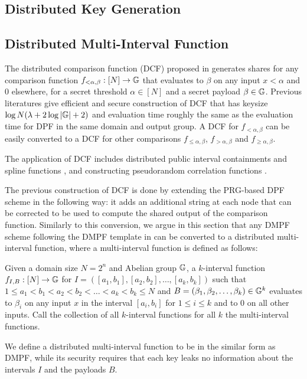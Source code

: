 \subsection{Distributed Key Generation}

\subsection{Distributed Multi-Interval Function}
The distributed comparison function (DCF) proposed in  generates shares for any comparison function $f_{<\alpha, \beta}:[N]\rightarrow \mathbb{G}$ that evaluates to $\beta$ on any input $x<\alpha$ and 0 elsewhere, for a secret threshold $\alpha\in[N]$ and a secret payload $\beta\in \mathbb{G}$. Previous literatures give efficient and secure construction of DCF that has keysize $\log N(\lambda+2\log |\mathbb{G}|+2)$ and evaluation time roughly the same as the evaluation time for DPF in the same domain and output group. A DCF for $f_{<\alpha, \beta}$ can be easily converted to a DCF for other comparisons $f_{\le \alpha, \beta}$, $f_{>\alpha,\beta}$ and $f_{\ge \alpha,\beta}$. 

The application of DCF includes distributed public interval containments and spline functions \cite{cryptoeprint:2020/1392,cryptoeprint:2019/1095}, and constructing pseudorandom correlation functions \cite{cryptoeprint:2022/1014}. 


The previous construction of DCF is done by extending the PRG-based DPF scheme in the following way: it adds an additional string at each node that can be corrected to be used to compute the shared output of the comparison function. Similarly to this conversion, we argue in this section that any DMPF scheme following the DMPF template in  can be converted to a distributed multi-interval function, where a multi-interval function is defined as follows: 
\begin{definition}
  Given a domain size $N=2^n$ and Abelian group $\mathbb{G}$, a $k$-interval function $f_{I,B}:[N]\rightarrow \mathbb{G}$ for $I = \left([a_1,b_1], [a_2,b_2], \dots, [a_k,b_k]\right)$ such that $1\le a_1<b_1<a_2<b_2<\dots<a_k<b_k\le N$ and $B = (\beta_1,\beta_2,\dots,\beta_k)\in \mathbb{G}^k$ evaluates to $\beta_i$ on any input $x$ in the interval $[a_i,b_i]$ for $1\le i\le k$ and to $0$ on all other inputs. Call the collection of all $k$-interval functions for all $k$ the multi-interval functions. 
\end{definition}
We define a distributed multi-interval function to be in the similar form as DMPF, while its security requires that each key leaks no information about the intervals $I$ and the payloads $B$. 

